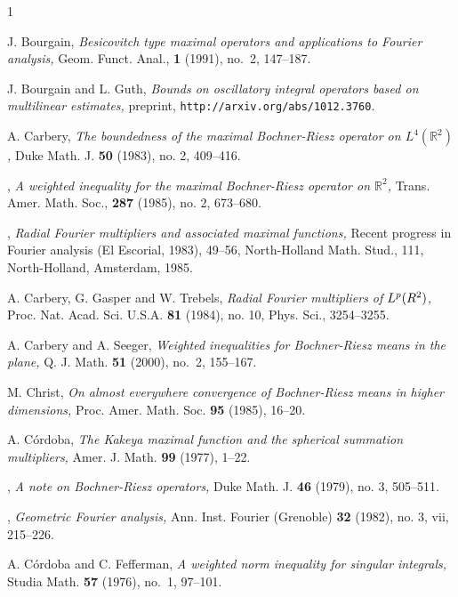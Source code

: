\documentclass[11pt]{amsart}
\theoremstyle{definition}
\numberwithin{theorem}{section}
\numberwithin{definition}{section}
\newcommand{\R}{\mathbb{R}}
\def\R{\mathbb R}
\def\emph#1{{\it #1 }}
\begin{document}
\begin{thebibliography}{1}


 J. Bourgain, \emph{Besicovitch type maximal operators and applications to Fourier analysis,}
 Geom. Funct. Anal., {\bf 1} (1991), no.~2, 147--187.

 J. Bourgain and L. Guth, \emph{Bounds on oscillatory integral operators based on multilinear estimates,}  preprint,
{\tt http://arxiv.org/abs/1012.3760}.


 A. Carbery, \emph{The boundedness of the maximal
 Bochner-Riesz operator on $L^4(\R^2)$,} Duke Math. J. {\bf 50} (1983), no. 2, 409--416.

 \bysame,
\emph{A weighted inequality for the maximal Bochner-Riesz operator
on $\R^2$,} {Trans. Amer. Math. Soc.,} {\bf 287} (1985), no. 2,
{673--680}.

 \bysame,
\emph{Radial Fourier multipliers and associated maximal functions,}  Recent progress in Fourier analysis (El Escorial, 1983),  49--56, North-Holland Math. Stud., 111, North-Holland, Amsterdam, 1985.



 A. Carbery, G. Gasper and  W. Trebels,
\emph{Radial Fourier multipliers of $L\sp{p}(R\sp{2})$,}  Proc. Nat. Acad. Sci. U.S.A.  {\bf 81}  (1984),  no. 10, Phys. Sci., 3254--3255.

 A. Carbery and A. Seeger, \emph{Weighted inequalities for Bochner-Riesz means in the plane,} Q. J. Math. {\bf 51} (2000), no.~2, 155--167.


 M. Christ, \emph{On almost everywhere convergence of
Bochner-Riesz means in higher dimensions,}  Proc. Amer. Math. Soc.
{\bf 95} (1985),  16--20.

 A. C\'ordoba, \emph{The Kakeya maximal function and the spherical summation multipliers,}
Amer. J. Math. {\bf 99} (1977), 1--22.

 \bysame, \emph{A note on Bochner-Riesz operators,}
  Duke Math. J.  {\bf 46} (1979), no. 3, 505--511.

 \bysame , \emph{Geometric Fourier analysis,}
Ann. Inst. Fourier (Grenoble) {\bf 32} (1982), no. 3, vii, 215--226.

 A. C\'ordoba and C. Fefferman, \emph{A weighted norm inequality for singular integrals,} Studia Math. {\bf 57} (1976), no.~1, 97--101.









\end{thebibliography}
\end{document}
